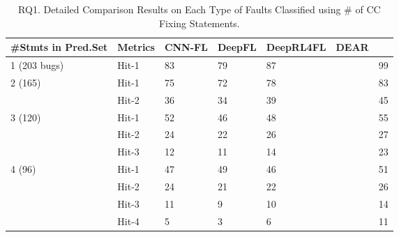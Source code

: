


\begin{table}[t]
	\caption{RQ1. Detailed Comparison Results on Each Type of Faults Classified using \# of CC Fixing Statements.}
\vspace{-10pt}
        \tabcolsep 2pt
	{\footnotesize
		\begin{center}
			\renewcommand{\arraystretch}{1}
			\begin{tabular}{p{1.3cm}<{\centering}|p{0.8cm}<{\centering}|p{1cm}<{\centering}|p{0.8cm}<{\centering}|p{1.3cm}<{\centering}|p{1cm}<{\centering}|p{1.3cm}<{\centering}}
				\hline
				\#Stmts in Pred.Set & Metrics & CNN-FL & DeepFL & DeepRL4FL & DEAR & \tool \\
				\hline
				\multirow{1}{*}{1 (203 bugs)}   & Hit-1  & 83 & 79 & 87 & & 99 \\
				\hline
				\multirow{2}{*}{2 (165)}  & Hit-1   & 75 & 72 & 78 & & 83 \\
				& Hit-2       						& 36 & 34 & 39 & & 45 \\
				\hline
				\multirow{3}{*}{3 (120)}  & Hit-1    & 52 & 46 & 48 & & 55 \\
				& Hit-2         					& 24 & 22 & 26 & & 27\\
				& Hit-3         				  	& 12 &11 & 14 & & 23 \\
				\hline
				\multirow{4}{*}{4 (96)}  & Hit-1    & 47 & 49 & 46 & & 51 \\
				& Hit-2        				    	 &24 & 21 & 22 & & 26 \\
				& Hit-3       					    & 11 & 9 & 10 & & 14 \\
				& Hit-4       					    & 5 & 3 & 6 & & 11 \\

\end{tabular}
\end{center}}
\end{table}
